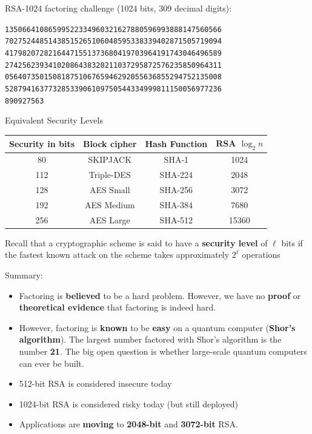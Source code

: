 \documentclass[12pt,titlepage]{article}
\begin{document}
RSA-1024 factoring challenge (1024 bits, 309 decimal digits):

\texttt{13506641086599522334960321627880596993888147560566\\70275244851438515265106048595338339402871505719094\\41798207282164471551373680419703964191743046496589\\27425623934102086438320211037295872576235850964311\\05640735015081875106765946292055636855294752135008\\52879416377328533906109750544334999811150056977236\\890927563}

Equivalent Security Levels
\begin{center}
\begin{tabular}{|c|c|c|c|}
	\hline
	Security in bits & Block cipher & Hash Function & RSA $\log_2 n$\\
	\hline
	80 & SKIPJACK & SHA-1 & 1024\\
	\hline
	112 & Triple-DES & SHA-224 & 2048\\
	\hline
	128 & AES Small & SHA-256 & 3072\\
	\hline
	192 & AES Medium & SHA-384 & 7680\\
	\hline
	256 & AES Large & SHA-512 & 15360\\
	\hline
\end{tabular}
\end{center}

Recall that a cryptographic scheme is said to have a \textbf{security level} of $\ell$ bits if the fastest known attack on the scheme takes approximately $2^\ell$ operations

Summary: \begin{itemize}
	\item Factoring is \textbf{believed} to be a hard problem. However, we have no \textbf{proof} or \textbf{theoretical evidence} that factoring is indeed hard.
	\item However, factoring is \textbf{known} to be \textbf{easy} on a quantum computer (\textbf{Shor’s algorithm}). The largest number factored with Shor’s algorithm is the number \textbf{21}. The big open question is whether large-scale quantum computers can ever be built.
	\item 512-bit RSA is considered insecure today
	\item 1024-bit RSA is considered risky today (but still deployed)
	\item Applications are \textbf{moving} to \textbf{2048-bit} and \textbf{3072-bit} RSA.
\end{itemize}
\end{document}
